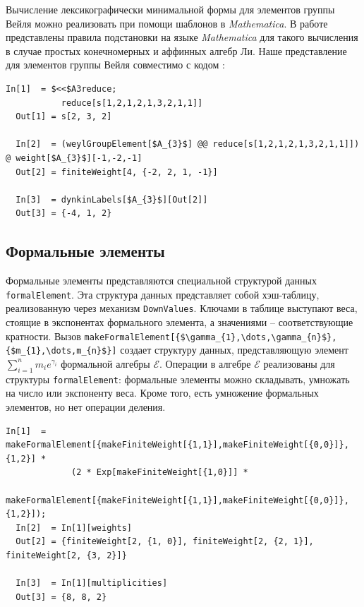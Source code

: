 Вычисление лексикографически минимальной формы \cite{casselman1994machine,casselman1995automata} для элементов группы Вейля можно реализовать при помощи шаблонов в  {\it Mathematica}. В работе \cite{KallenShortlex} представлены правила подстановки на языке {\it Mathematica} для такого вычисления в случае простых конечномерных и аффинных алгебр Ли. Наше представление для элементов группы Вейля совместимо с кодом \cite{KallenShortlex}:
\begin{lstlisting}[mathescape=true]
  In[1]  = $<<$A3reduce;
           reduce[s[1,2,1,2,1,3,2,1,1]]
  Out[1] = s[2, 3, 2]

  In[2]  = (weylGroupElement[$A_{3}$] @@ reduce[s[1,2,1,2,1,3,2,1,1]]) @ weight[$A_{3}$][-1,-2,-1]
  Out[2] = finiteWeight[4, {-2, 2, 1, -1}]

  In[3]  = dynkinLabels[$A_{3}$][Out[2]]
  Out[3] = {-4, 1, 2}
\end{lstlisting}

\subsection{Формальные элементы}
\label{sec:formal-elements}

Формальные элементы представляются специальной структурой данных \lstinline{formalElement}. Эта структура данных представляет собой хэш-таблицу, реализованную через механизм \lstinline{DownValues}. Ключами в таблице выступают веса, стоящие в экспонентах формального элемента, а значениями -- соответствующие кратности.  Вызов \lstinline[mathescape=true]!makeFormalElement[{$\gamma_{1},\dots,\gamma_{n}$},{$m_{1},\dots,m_{n}$}]! создает структуру данных, представляющую элемент $\sum_{i=1}^{n} m_{i} e^{\gamma_{i}}$ формальной алгебры $\mathcal{E}$. Операции в алгебре  $\mathcal{E}$ реализованы для структуры \lstinline{formalElement}: формальные элементы можно складывать, умножать на число или экспоненту веса. Кроме того, есть умножение формальных элементов, но нет операции деления.
\begin{lstlisting}[mathescape=true]
  In[1]  = makeFormalElement[{makeFiniteWeight[{1,1}],makeFiniteWeight[{0,0}]},{1,2}] *
             (2 * Exp[makeFiniteWeight[{1,0}]] *
             makeFormalElement[{makeFiniteWeight[{1,1}],makeFiniteWeight[{0,0}]},{1,2}]);
  In[2]  = In[1][weights]
  Out[2] = {finiteWeight[2, {1, 0}], finiteWeight[2, {2, 1}], finiteWeight[2, {3, 2}]}

  In[3]  = In[1][multiplicities]
  Out[3] = {8, 8, 2}
\end{lstlisting}


